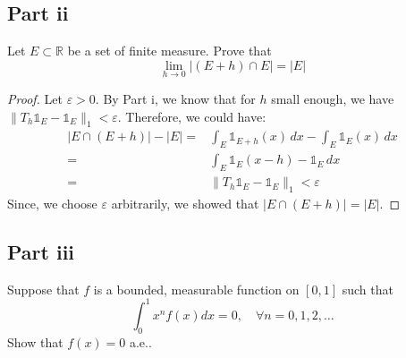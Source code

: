 \subsection{Part ii}

\begin{question}
    Let $E \subset \mathbb{R}$ be a set of finite measure. Prove that
    $$
    \lim _{h \rightarrow 0}|(E+h) \cap E|=|E|
    $$
\end{question}

\begin{answer}
    \begin{proof}
        Let $\varepsilon > 0$. By Part i, we know that for $h$ small enough, we have $\lVert T_h \mathbb{1}_{E} - \mathbb{1}_E\rVert_1 < \varepsilon$. Therefore, we could have:
        \begin{equation}
            \begin{aligned}
                \lvert E \cap (E+h) \rvert - \lvert E \rvert = &\int_E \mathbb{1}_{E+h}(x) \,dx - \int_E \mathbb{1}_E(x)\,dx\\
                = &\int_E \mathbb{1}_{E}(x-h) - \mathbb{1}_E \,dx\\
                = &\lVert T_h \mathbb{1}_E - \mathbb{1}_E \rVert_1 < \varepsilon
            \end{aligned}
        \end{equation}
        Since, we choose $\varepsilon$ arbitrarily, we showed that $\lvert E \cap (E+h)\rvert = \lvert E \rvert$.
    \end{proof}
\end{answer}

\subsection{Part iii}

\begin{question}
    Suppose that $f$ is a bounded, measurable function on $[0,1]$ such that
    $$
    \int_0^1 x^n f(x) d x=0, \quad \forall n=0,1,2, \ldots
    $$
    Show that $f(x)=0$ a.e..
\end{question}

